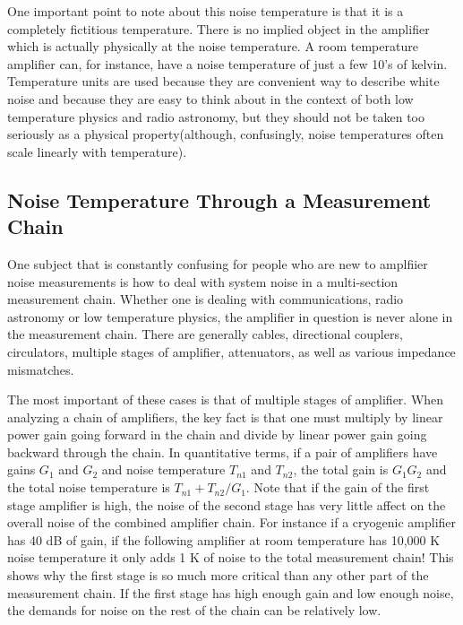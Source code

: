 \documentclass{report}
\begin{document}
	One important point to note about this noise temperature is that it is a completely fictitious temperature.  There is no implied object in the amplifier which is actually physically at the noise temperature.  A room temperature amplifier can, for instance, have a noise temperature of just a few 10's of kelvin.  Temperature units are used because they are convenient way to describe white noise and because they are easy to think about in the context of both low temperature physics and radio astronomy, but they should not be taken too seriously as a physical property(although, confusingly, noise temperatures often scale linearly with temperature).  

	\subsection{Noise Temperature Through a Measurement Chain}

	One subject that is constantly confusing for people who are new to amplfiier noise measurements is how to deal with system noise in a multi-section measurement chain.  Whether one is dealing with communications, radio astronomy or low temperature physics, the amplifier in question is never alone in the measurement chain.  There are generally cables, directional couplers, circulators, multiple stages of amplifier, attenuators, as well as various impedance mismatches.  

	The most important of these cases is that of multiple stages of amplifier.  When analyzing a chain of amplifiers, the key fact is that one must multiply by linear power gain going forward in the chain and divide by linear power gain going backward through the chain.  In quantitative terms, if a pair of amplifiers have gains $G_1$ and $G_2$ and noise temperature $T_{n1}$ and $T_{n2}$, the total gain is $G_1G_2$ and the total noise temperature is $T_{n1} + T_{n2}/G_1$.  Note that if the gain of the first stage amplifier is high, the noise of the second stage has very little affect on the overall noise of the combined amplifier chain.  For instance if a cryogenic amplifier has 40 dB of gain, if the following amplifier at room temperature has 10,000 K noise temperature it only adds 1 K of noise to the total measurement chain!  This shows why the first stage is so much more critical than any other part of the measurement chain.  If the first stage has high enough gain and low enough noise, the demands for noise on the rest of the chain can be relatively low.  
\end{document}

